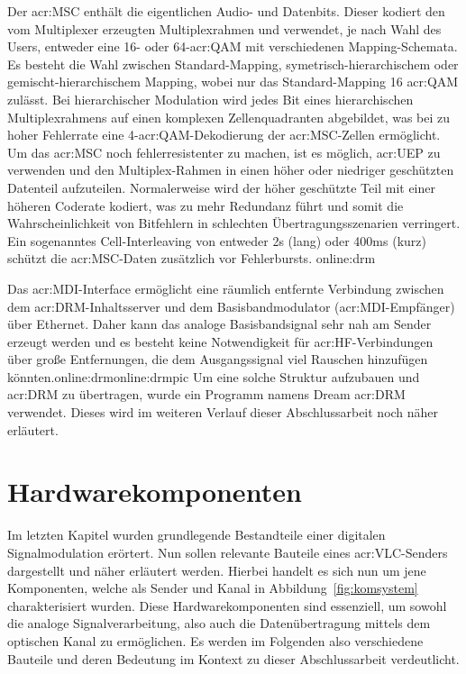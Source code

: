 Der \gls{acr:MSC} enthält die eigentlichen Audio- und Datenbits. Dieser kodiert den vom Multiplexer erzeugten Multiplexrahmen und verwendet, je nach Wahl des Users, entweder eine 16- oder 64-\gls{acr:QAM} mit verschiedenen Mapping-Schemata. Es besteht die Wahl zwischen Standard-Mapping, symetrisch-hierarchischem oder gemischt-hierarchischem Mapping, wobei nur das Standard-Mapping 16 \gls{acr:QAM} zulässt. Bei hierarchischer Modulation wird jedes Bit eines hierarchischen Multiplexrahmens auf einen komplexen Zellenquadranten abgebildet, was bei zu hoher Fehlerrate eine 4-\gls{acr:QAM}-Dekodierung der \gls{acr:MSC}-Zellen ermöglicht. Um das \gls{acr:MSC} noch fehlerresistenter zu machen, ist es möglich, \gls{acr:UEP} zu verwenden und den Multiplex-Rahmen in einen höher oder niedriger geschützten Datenteil aufzuteilen. Normalerweise wird der höher geschützte Teil mit einer höheren Coderate kodiert, was zu mehr Redundanz führt und somit die Wahrscheinlichkeit von Bitfehlern in schlechten Übertragungsszenarien verringert. Ein sogenanntes Cell-Interleaving von entweder 2s (lang) oder 400ms (kurz) schützt die \gls{acr:MSC}-Daten zusätzlich vor Fehlerbursts. \gls{online:drm}

Das \gls{acr:MDI}-Interface ermöglicht eine räumlich entfernte Verbindung zwischen dem \gls{acr:DRM}-Inhaltsserver und dem Basisbandmodulator (\gls{acr:MDI}-Empfänger) über Ethernet. Daher kann das analoge Basisbandsignal sehr nah am Sender erzeugt werden und es besteht keine Notwendigkeit für \gls{acr:HF}-Verbindungen über große Entfernungen, die dem Ausgangssignal viel Rauschen hinzufügen könnten.\gls{online:drm}\gls{online:drmpic} Um eine solche Struktur aufzubauen und \gls{acr:DRM} zu übertragen, wurde ein Programm namens Dream \gls{acr:DRM} verwendet. Dieses wird im weiteren Verlauf dieser Abschlussarbeit noch näher erläutert. 
\newpage
\section{Hardwarekomponenten}
\label{subsec:elbau}
Im letzten Kapitel wurden grundlegende Bestandteile einer digitalen Signalmodulation erörtert. Nun sollen  relevante Bauteile eines \gls{acr:VLC}-Senders dargestellt und näher erläutert werden. Hierbei handelt es sich nun um jene Komponenten, welche als Sender und Kanal in Abbildung~\ref{fig:komsystem} charakterisiert wurden. Diese Hardwarekomponenten sind essenziell, um sowohl die analoge Signalverarbeitung, also auch die Datenübertragung mittels dem optischen Kanal zu ermöglichen. Es werden im Folgenden also verschiedene Bauteile und deren Bedeutung im Kontext zu dieser Abschlussarbeit verdeutlicht.

